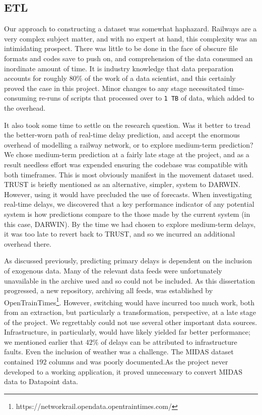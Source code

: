 \documentclass[12pt,a4paper]{article}
\begin{document}
\subsection{ETL}

Our approach to constructing a dataset was somewhat haphazard. Railways are a very complex subject matter, and with no expert at hand, this complexity was an intimidating prospect. There was little to be done in the face of obscure file formats and codes save to push on, and comprehension of the data consumed an inordinate amount of time.  It is industry knowledge that data preparation accounts for roughly $80\%$ of the work of a data scientist, and this certainly proved the case in this project. Minor changes to any stage necessitated time-consuming re-runs of scripts that processed over to \verb|1 TB| of data, which added to the overhead. 

It also took some time to settle on the research question. Was it better to tread the better-worn path of real-time delay prediction, and accept the enormous overhead of modelling a railway network, or to explore medium-term prediction? We chose medium-term prediction at a fairly late stage at the project, and as a result needless effort was expended ensuring the codebase was compatible with both timeframes. This is most obviously manifest in the movement dataset used. TRUST is briefly mentioned as an alternative, simpler, system to DARWIN. However, using it would have precluded the use of forecasts. When investigating real-time delays, we discovered that a key performance indicator of any potential system is how predictions compare to the those made by the current system (in this case, DARWIN). By the time we had chosen to explore medium-term delays, it was too late to revert back to TRUST, and so we incurred an additional overhead there. 

As discussed previously, predicting primary delays is dependent on the inclusion of exogenous data. Many of the relevant data feeds were unfortunately unavailable in the archive used and so could not be included. As this dissertation progressed, a new repository, archiving all feeds, was established by OpenTrainTimes\footnote{https://networkrail.opendata.opentraintimes.com/}. However, switching would have incurred too much work, both from an extraction, but particularly a transformation, perspective, at a late stage of the project. We regrettably could not use several other important data sources. Infrastructure, in particularly, would have likely yielded far better performance; we mentioned earlier that $42\%$ of delays can be attributed to infrastructure faults. Even the inclusion of weather was a challenge. The MIDAS dataset contained $192$ columns and was poorly documented.As the project never developed to a working application, it proved unnecessary to convert MIDAS data to Datapoint data.
\end{document}
